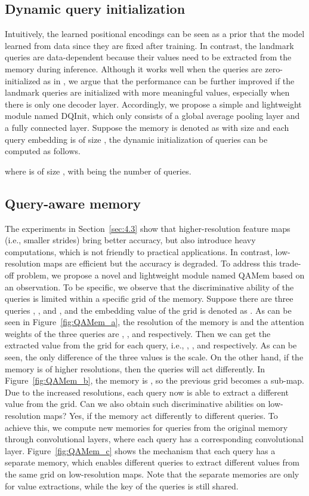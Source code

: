 \documentclass{article}
\begin{document}
\subsection{Dynamic query initialization}
\label{sec:3.2}

Intuitively, the learned positional encodings can be seen as a prior that the model learned from data since they are fixed after training. In contrast, the landmark queries are data-dependent because their values need to be extracted from the memory during inference. Although it works well when the queries are zero-initialized as in \citep{CMS20}, we argue that the performance can be further improved if the landmark queries are initialized with more meaningful values, especially when there is only one decoder layer. Accordingly, we propose a simple and lightweight module named DQInit, which only consists of a global average pooling layer and a fully connected layer. Suppose the memory is denoted as  with size  and each query embedding is of size , the dynamic initialization of queries can be computed as follows.



where  is of size , with  being the number of queries.

\subsection{Query-aware memory}
\label{sec:3.3}

The experiments in Section~\ref{sec:4.3} show that higher-resolution feature maps (i.e., smaller strides) bring better accuracy, but also introduce heavy computations, which is not friendly to practical applications. In contrast, low-resolution maps are efficient but the accuracy is degraded. To address this trade-off problem, we propose a novel and lightweight module named QAMem based on an observation. To be specific, we observe that the discriminative ability of the queries is limited within a specific grid of the memory. Suppose there are three queries , , and , and the embedding value of the grid is denoted as . As can be seen in Figure~\ref{fig:QAMem_a}, the resolution of the memory is  and the attention weights of the three queries are , , and  respectively. Then we can get the extracted value from the grid for each query, i.e., , , and  respectively. As can be seen, the only difference of the three values is the scale. On the other hand, if the memory is of higher resolutions, then the queries will act differently. In Figure~\ref{fig:QAMem_b}, the memory is , so the previous grid becomes a  sub-map. Due to the increased resolutions, each query now is able to extract a different value from the grid. Can we also obtain such discriminative abilities on low-resolution maps? Yes, if the memory act differently to different queries. To achieve this, we compute  new memories for  queries from the original memory through  convolutional layers, where each query has a corresponding convolutional layer. Figure~\ref{fig:QAMem_c} shows the mechanism that each query has a separate memory, which enables different queries to extract different values from the same grid on low-resolution maps. Note that the separate memories are only for value extractions, while the key of the queries is still shared. 
\end{document}
